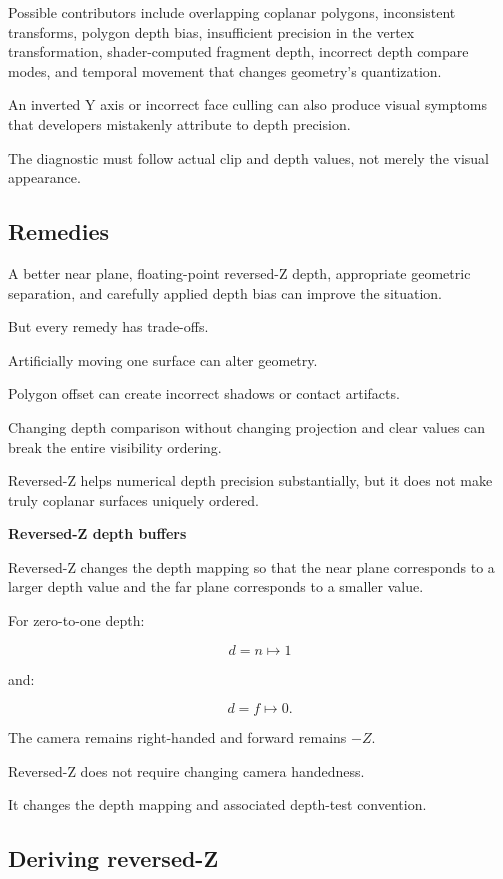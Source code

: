 Possible contributors include overlapping coplanar polygons, inconsistent transforms, polygon depth bias, insufficient precision in the vertex transformation, shader-computed fragment depth, incorrect depth compare modes, and temporal movement that changes geometry's quantization.

An inverted Y axis or incorrect face culling can also produce visual symptoms that developers mistakenly attribute to depth precision.

The diagnostic must follow actual clip and depth values, not merely the visual appearance.

\subsection{Remedies}\label{02-foundations-ii-ch033-remedies}

\hypertarget{02-foundations-ii-ch033-remedies}{}

A better near plane, floating-point reversed-Z depth, appropriate geometric separation, and carefully applied depth bias can improve the situation.

But every remedy has trade-offs.

Artificially moving one surface can alter geometry.

Polygon offset can create incorrect shadows or contact artifacts.

Changing depth comparison without changing projection and clear values can break the entire visibility ordering.

Reversed-Z helps numerical depth precision substantially, but it does not make truly coplanar surfaces uniquely ordered.

\textbf{Reversed-Z depth buffers}

Reversed-Z changes the depth mapping so that the near plane corresponds to a larger depth value and the far plane corresponds to a smaller value.

For zero-to-one depth:

\[
 \boxed{ d=n\mapsto1 }
\]

and:

\[
 \boxed{ d=f\mapsto0 }.
\]

The camera remains right-handed and forward remains \(-Z\).

Reversed-Z does not require changing camera handedness.

It changes the depth mapping and associated depth-test convention.

\subsection{Deriving reversed-Z}\label{02-foundations-ii-ch033-deriving-reversed-z}

